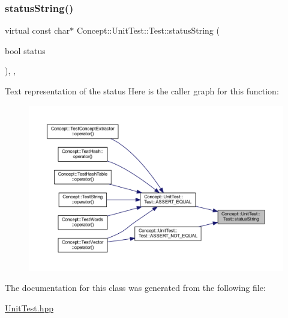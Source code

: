 \mbox{\label{class_concept_1_1_unit_test_1_1_test_a0aabaa449e45a2a99e473693eed0f3ed}} 
\subsubsection{\texorpdfstring{statusString()}{statusString()}}
{\footnotesize\ttfamily virtual const char$\ast$ Concept\+::\+Unit\+Test\+::\+Test\+::status\+String (\begin{DoxyParamCaption}\item[{bool}]{status }\end{DoxyParamCaption})\hspace{0.3cm}{\ttfamily [inline]}, {\ttfamily [protected]}, {\ttfamily [virtual]}}

Text representation of the status Here is the caller graph for this function\+:\nopagebreak
\begin{figure}[H]
\begin{center}
\leavevmode
\includegraphics[width=350pt]{class_concept_1_1_unit_test_1_1_test_a0aabaa449e45a2a99e473693eed0f3ed_icgraph}
\end{center}
\end{figure}


The documentation for this class was generated from the following file\+:\begin{DoxyCompactItemize}
\item 
\mbox{\hyperlink{_unit_test_8hpp}{Unit\+Test.\+hpp}}\end{DoxyCompactItemize}
